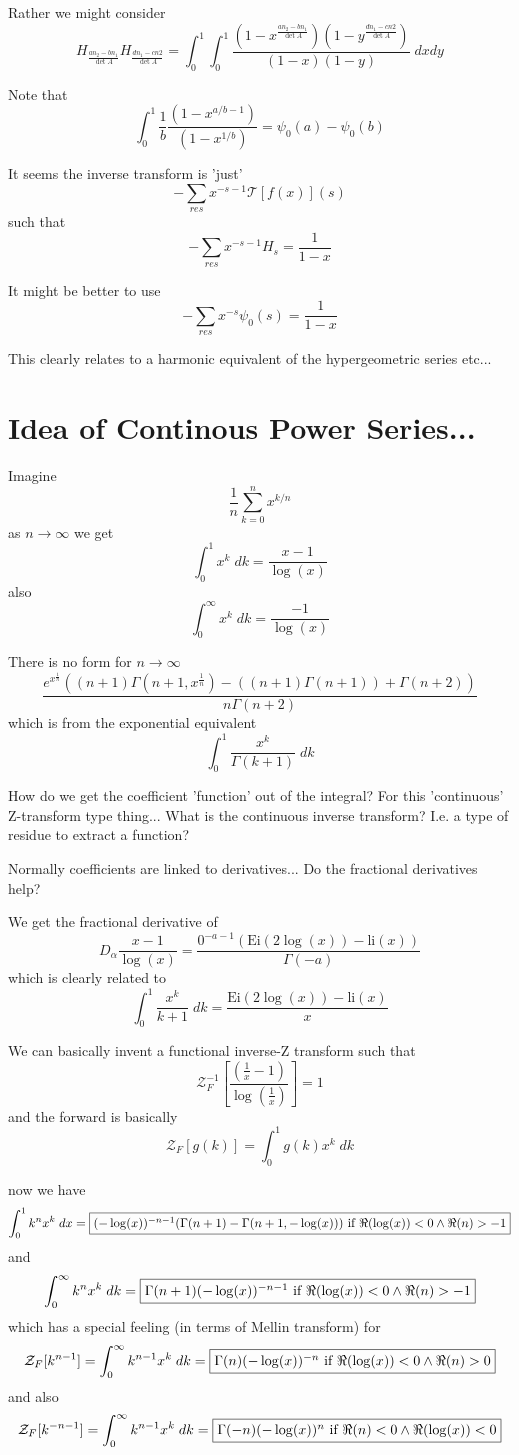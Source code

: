 \documentclass{article}
\begin{document}
Rather we might consider
$$
H_{\frac{a n_2 - b n_1}{\det A}}H_{\frac{d n_1 - c n 2}{\det A}} = \int_0^1\int_0^1\frac{(1-x^{\frac{a n_2 - b n_1}{\det A}})(1-y^{\frac{d n_1 - c n 2}{\det A}})}{(1 - x)(1 - y)} \; dx dy
$$

Note that 
$$
\int_0^1 \frac{1}{b}\frac{(1 - x^{a/b - 1})}{(1 - x^{1/b})} = \psi_0(a) - \psi_0(b)
$$


It seems the inverse transform is 'just' 
$$
-\sum_{res} x^{-s-1} \mathcal{T}[f(x)](s)
$$
such that 
$$
-\sum_{res} x^{-s-1} H_s = \frac{1}{1-x}
$$

It might be better to use
$$
-\sum_{res} x^{-s} \psi_0(s) = \frac{1}{1-x}
$$

This clearly relates to a harmonic equivalent of the hypergeometric series etc...


\section{Idea of Continous Power Series...}
Imagine 
$$
\frac{1}{n} \sum_{k=0}^n x^{k/n}
$$
as $n \to \infty$ we get 
$$
\int_0^1 x^k \; dk = \frac{x-1}{\log(x)}
$$
also
$$
\int_0^\infty x^k \; dk = \frac{-1}{\log(x)}
$$


There is no form for $n \to \infty$
$$
\frac{e^{x^{\frac{1}{n}}} \left((n+1) \Gamma \left(n+1,x^{\frac{1}{n}}\right)-((n+1) \Gamma (n+1))+\Gamma (n+2)\right)}{n \Gamma (n+2)}
$$
which is from the exponential equivalent
$$
\int_0^1 \frac{x^k}{\Gamma(k+1)} \; dk
$$

How do we get the coefficient 'function' out of the integral? For this 'continuous' Z-transform type thing... What is the continuous inverse transform? I.e. a type of residue to extract a function? 

Normally coefficients are linked to derivatives... Do the fractional derivatives help? 

We get the fractional derivative of 
$$
D_\alpha \frac{x-1}{\log(x)} = \frac{0^{-a-1} (\text{Ei}(2 \log (x))-\text{li}(x))}{\Gamma (-a)}
$$
which is clearly related to 
$$
\int_0^1 \frac{x^k}{k+1} \; dk = \frac{\text{Ei}(2 \log (x))-\text{li}(x)}{x}
$$

We can basically invent a functional inverse-Z transform such that 
$$
\mathcal{Z}^{-1}_F \left[\frac{(\frac{1}{x}-1)}{\log(\frac{1}{x})}\right] = 1
$$
and the forward is basically 
$$
\mathcal{Z}_F[g(k)] = \int_0^1 g(k) x^k \; dk
$$

now we have 
$$
\int_0^1 k^n x^k \; dx = \fbox{$(-\log (x))^{-n-1} (\Gamma (n+1)-\Gamma (n+1,-\log (x)))\text{ if }\Re(\log (x))<0\land \Re(n)>-1$}
$$
and 
$$
\int_0^\infty k^n x^k \; dk =  \fbox{$\Gamma (n+1) (-\log (x))^{-n-1}\text{ if }\Re(\log (x))<0\land \Re(n)>-1$}
$$
which has a special feeling (in terms of Mellin transform) for
$$
\mathcal{Z}_F[k^{n-1}] = \int_0^\infty k^{n-1} x^k \; dk = \fbox{$\Gamma (n) (-\log (x))^{-n}\text{ if }\Re(\log (x))<0\land \Re(n)>0$}
$$
and also
$$
\mathcal{Z}_F[k^{-n-1}] = \int_0^\infty k^{n-1} x^k \; dk = \fbox{$\Gamma (-n) (-\log (x))^n\text{ if }\Re(n)<0\land \Re(\log (x))<0$}
$$
\end{document}
